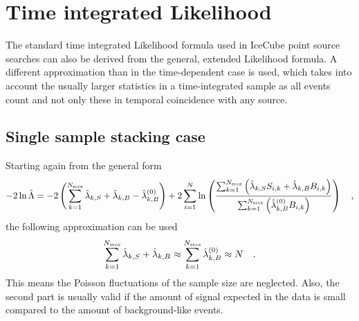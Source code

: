 \section{Time integrated Likelihood}
  \label{chp:pointsource_time_int_llh}
The standard time integrated Likelihood formula used in IceCube point source searches can also be derived from the general, extended Likelihood formula.
A different approximation than in the time-dependent case is used, which takes into account the usually larger statistics in a time-integrated sample as all events count and not only these in temporal coincidence with any source.

\subsection{Single sample stacking case}
Starting again from the general form
\begin{equation}
  -2\ln\hat{\Lambda}
  = -2\left(\sum_{k=1}^{N_\text{srcs}}\hat{\lambda}_{k,S} +
                                      \hat{\lambda}_{k,B} -
                                      \hat{\lambda}_{k,B}^{(0)}\right) +
    2\sum_{i=1}^N \ln\left(
      \frac{\sum_{k=1}^{N_\text{srcs}}\left(
          \hat{\lambda}_{k,S} S_{i,k}+\hat{\lambda}_{k,B} B_{i,k}\right)}
          {\sum_{k=1}^{N_\text{srcs}}\left(
            \hat{\lambda}_{k,B}^{(0)} B_{i,k}
          \right)}
        \right)
  \quad\text{,}
\end{equation}
the following approximation can be used
\begin{equation}
  \label{equ:time_indep_fixed_expectation}
  \sum_{k=1}^{N_\text{srcs}} \hat{\lambda}_{k,S} + \hat{\lambda}_{k,B} \approx
    \sum_{k=1}^{N_\text{srcs}} \hat{\lambda}_{k,B}^{(0)} \approx N
  \quad\text{.}
\end{equation}
This means the Poisson fluctuations of the sample size are neglected.
Also, the second part is usually valid if the amount of signal expected in the data is small compared to the amount of background-like events.

